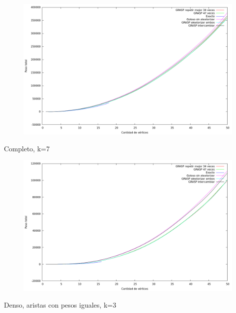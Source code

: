 \begin{figure}[H]
  \begin{center}
    \includegraphics[scale=0.35]{imagenes/ej6-completo-k3-peso.png}
  \end{center}
\end{figure}

Completo, k=7

\begin{figure}[H]
  \begin{center}
    \includegraphics[scale=0.35]{imagenes/ej6-completo-k7-peso.png}
  \end{center}
\end{figure}

Denso, aristas con pesos iguales, k=3

